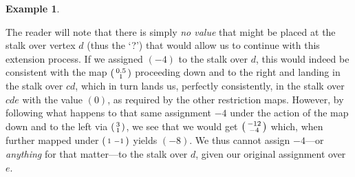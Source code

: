 \documentclass[a4paper]{book}
\theoremstyle{definition}
\newtheorem{example}{Example}[section]
\theoremstyle{definition}
\theoremstyle{definition}
\theoremstyle{theorem}
\theoremstyle{definition}
\begin{document}
\begin{example}
\begin{center}
		\end{center}
		The reader will note that there is simply \textit{no value} that might be placed at the stalk over vertex $d$ (thus the `?') that would allow us to continue with this extension process. If we assigned $(-4)$ to the stalk over $d$, this would indeed be consistent with the map $\begin{psmallmatrix}
		0.5 \\ 1 \end{psmallmatrix}$ proceeding down and to the right and landing in the stalk over $cd$, which in turn lands us, perfectly consistently, in the stalk over $cde$ with the value $(0)$, as required by the other restriction maps. However, by following what happens to that same assignment $-4$ under the action of the map down and to the left via $\begin{psmallmatrix} 3 \\ 1 \end{psmallmatrix}$, we see that we would get $\begin{psmallmatrix}
		-12 \\ -4 \end{psmallmatrix}$ which, when further mapped under $\begin{psmallmatrix}
		1 & -1 \end{psmallmatrix}$ yields $(-8)$. We thus cannot assign $-4$---or \textit{anything} for that matter---to the stalk over $d$, given our original assignment over $e$. \par 

\end{example}
\end{document}
